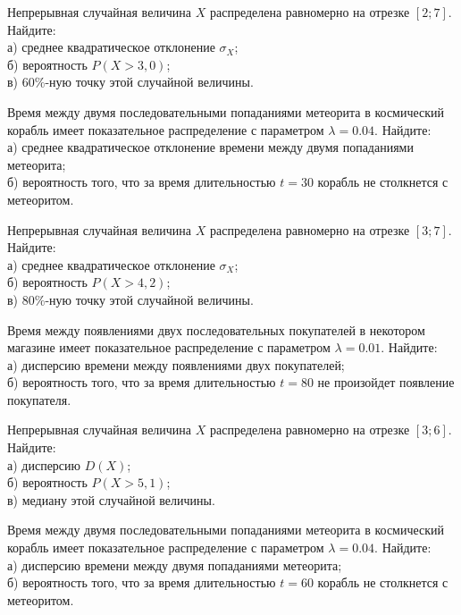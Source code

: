 \vfill

\newpage\setcounter{zad}{0}

\z Непрерывная случайная величина $X$ распределена равномерно на отрезке $[2; 7]$. Найдите: \\ \quad а) среднее квадратическое отклонение $\sigma_X$; \\ \quad б) вероятность $P(X>3{,}0)$; \\ \quad в) $60\%$-ную точку этой случайной величины.


\vfill

\z Время между двумя последовательными попаданиями метеорита в космический корабль имеет показательное распределение с параметром $\lambda = 0.04$. Найдите: \\ \quad а) среднее квадратическое отклонение времени между двумя попаданиями метеорита; \\ \quad б) вероятность того, что за время длительностью $t = 30$ корабль не столкнется с метеоритом.
 

\vfill

\newpage\setcounter{zad}{0}

\z Непрерывная случайная величина $X$ распределена равномерно на отрезке $[3; 7]$. Найдите: \\ \quad а) среднее квадратическое отклонение $\sigma_X$; \\ \quad б) вероятность $P(X>4{,}2)$; \\ \quad в) $80\%$-ную точку этой случайной величины.


\vfill

\z Время между появлениями двух последовательных покупателей в некотором магазине имеет показательное распределение с параметром $\lambda = 0.01$. Найдите: \\ \quad а) дисперсию времени между появлениями двух покупателей; \\ \quad б) вероятность того, что за время длительностью $t = 80$ не произойдет появление покупателя.
 

\vfill

\newpage\setcounter{zad}{0}

\z Непрерывная случайная величина $X$ распределена равномерно на отрезке $[3; 6]$. Найдите: \\ \quad а) дисперсию $D(X)$; \\ \quad б) вероятность $P(X>5{,}1)$; \\ \quad в) медиану этой случайной величины.


\vfill

\z Время между двумя последовательными попаданиями метеорита в космический корабль имеет показательное распределение с параметром $\lambda = 0.04$. Найдите: \\ \quad а) дисперсию времени между двумя попаданиями метеорита; \\ \quad б) вероятность того, что за время длительностью $t = 60$ корабль не столкнется с метеоритом.
 

